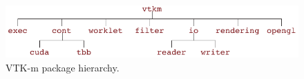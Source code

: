 \begin{figure}[htb]
  \centering
  \includegraphics{images/PackageHierarchy}
  \caption{VTK-m package hierarchy.}
  \label{fig:Packages}
\end{figure}

